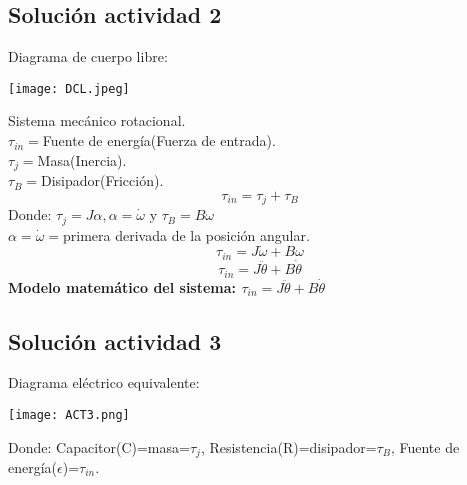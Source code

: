 \subsection{Solución actividad 2}
Diagrama de cuerpo libre:\\
\begin{center}
\texttt{[image: DCL.jpeg]} \\
\end{center}
Sistema mecánico rotacional.\\
$\tau_{in}=$Fuente de energía(Fuerza de entrada).\\
$\tau_{j}=$Masa(Inercia).\\
$\tau_{B}=$Disipador(Fricción).\\
$$\tau_{in}=\tau_{j}+\tau_{B}$$
Donde: $\tau_{j}=J\alpha,\alpha=\dot{\omega}$ y $\tau_{B}=B\omega$\\
$\alpha=\dot{\omega}=$primera derivada de la posición angular.
$$\tau_{in}=J\dot{\omega}+B\omega$$
$$\tau_{in}=J\ddot{\theta}+B\dot{\theta}$$
\textbf{Modelo matemático del sistema: $\tau_{in}=J\ddot{\theta}+B\dot{\theta}$}\\

\begin{center}
\end{center}

\subsection{Solución actividad 3}

Diagrama eléctrico equivalente:\\
\begin{center}
\texttt{[image: ACT3.png]} 
\end{center}
Donde: Capacitor(C)=masa=$\tau_{j}$, Resistencia(R)=disipador=$\tau_{B}$, Fuente de energía($\epsilon$)=$\tau_{in}$.


